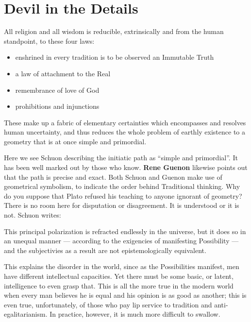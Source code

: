 \section{Devil in the Details}

\begin{quotex}
All religion and all wisdom is reducible, extrinsically and from the human standpoint, to these four laws:

\begin{itemize}


\item enshrined in every tradition is to be observed an Immutable Truth

\item a law of attachment to the Real

\item remembrance of love of God

\item prohibitions and injunctions
\end{itemize}

These make up a fabric of elementary certainties which encompasses and resolves human uncertainty, and thus reduces the whole problem of earthly existence to a geometry that is at once simple and primordial.
\end{quotex}

Here we see Schuon describing the initiatic path as ``simple and primordial''. It has been well marked out by those who know. \textbf{Rene Guenon} likewise points out that the path is precise and exact. Both Schuon and Guenon make use of geometrical symbolism, to indicate the order behind Traditional thinking. Why do you suppose that Plato refused his teaching to anyone ignorant of geometry? There is no room here for disputation or disagreement. It is understood or it is not. Schuon writes:

\begin{quotex}
This principal polarization is refracted endlessly in the universe, but it does so in an unequal manner --- according to the exigencies of manifesting Possibility --- and the subjectivies as a result are not epistemologically equivalent.
\end{quotex}


This explains the disorder in the world, since as the Possibilities manifest, men have different intellectual capacities. Yet there must be some basic, or latent, intelligence to even grasp that. This is all the more true in the modern world when every man believes he is equal and his opinion is as good as another; this is even true, unfortunately, of those who pay lip service to tradition and anti-egalitarianism. In practice, however, it is much more difficult to swallow.

